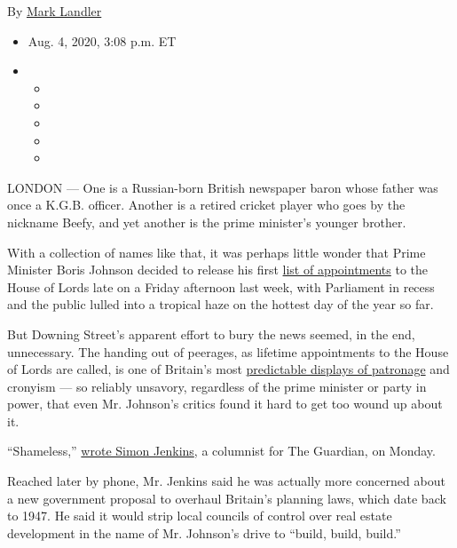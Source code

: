 By \href{https://www.nytimes3xbfgragh.onion/by/mark-landler}{Mark
Landler}

\begin{itemize}
\item
  Aug. 4, 2020, 3:08 p.m. ET
\item
  \begin{itemize}
  \item
  \item
  \item
  \item
  \item
  \end{itemize}
\end{itemize}

LONDON --- One is a Russian-born British newspaper baron whose father
was once a K.G.B. officer. Another is a retired cricket player who goes
by the nickname Beefy, and yet another is the prime minister's younger
brother.

With a collection of names like that, it was perhaps little wonder that
Prime Minister Boris Johnson decided to release his first
\href{https://www.nytimes3xbfgragh.onion/aponline/2020/07/31/world/europe/ap-eu-britain-house-of-lords-1st-ld-writethru.html}{list
of appointments} to the House of Lords late on a Friday afternoon last
week, with Parliament in recess and the public lulled into a tropical
haze on the hottest day of the year so far.

But Downing Street's apparent effort to bury the news seemed, in the
end, unnecessary. The handing out of peerages, as lifetime appointments
to the House of Lords are called, is one of Britain's most
\href{https://www.nytimes3xbfgragh.onion/2015/12/18/world/europe/britain-house-of-lords-changes.html}{predictable
displays of patronage} and cronyism --- so reliably unsavory, regardless
of the prime minister or party in power, that even Mr. Johnson's critics
found it hard to get too wound up about it.

``Shameless,''
\href{https://www.theguardian.com/commentisfree/2020/aug/03/boris-johnsons-list-of-lords-is-a-disgrace-corruption-westminster}{wrote
Simon Jenkins}, a columnist for The Guardian, on Monday.

Reached later by phone, Mr. Jenkins said he was actually more concerned
about a new government proposal to overhaul Britain's planning laws,
which date back to 1947. He said it would strip local councils of
control over real estate development in the name of Mr. Johnson's drive
to ``build, build, build.''

